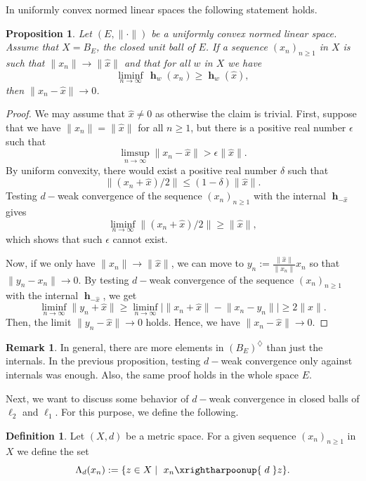 \documentclass[a4paper,12pt]{article}
\newtheorem{prop}[thm]{Proposition}
\theoremstyle{definition}
\newtheorem{rem}[thm]{Remark}
\newtheorem{defn}[thm]{Definition}
\DeclareMathOperator{\h}{\mathbf{h}}
\newcommand{\norm}[1]{\lVert#1\rVert}
\numberwithin{equation}{section}
\begin{document}
In uniformly convex normed linear spaces the following statement holds.

\begin{prop}
Let $(E,\norm{\cdot})$ be a uniformly convex normed linear space. Assume that 
$X=B_E$, the closed unit ball of $E$. If a sequence $(x_n)_{n\geq 1}$ in $X$ is 
such that $ \norm{x_n}  \rightarrow \norm{\hat x} $ and that for all $w$ in
$X$ we have 
$$
	\liminf_{n\to\infty}\,\h_w(x_n)  \geq \h_w(\hat x),
$$
then $ \norm{ x_n - \hat x }  \rightarrow 0$.
\end{prop}

\begin{proof} 
We may assume that $\hat x \not=0$ as otherwise the claim is trivial. First,
suppose that we have $\norm{x_n} = \norm{ \hat x }$ for all $n\geq 1$, but there 
is a positive real number $\epsilon$ such that
$$
	\limsup_{n\to\infty} \norm{x_n - \hat x }  > \epsilon\norm{\hat x}.
$$ 
By uniform convexity, there would exist a positive real number $\delta$ 
such that 
$$
\norm{ (x_n + \hat x)/2 }  \leq (1-\delta) \norm{\hat x }.
$$
Testing $d-$weak convergence of the sequence $(x_n)_{n\geq 1}$ with the 
internal $\h_{-\hat x}$ gives
$$
\liminf_{n\to\infty} \norm{ ( x_n + \hat x)/2 } \geq \norm{\hat x},
$$ 
which shows that such $\epsilon $ cannot exist. 

Now, if we only have  $ \norm{ x_n } \rightarrow \norm{\hat x }$, we can 
move to $y_n :=  \frac { \norm{ \hat x }}{\norm{x_n} } x_n$ so that 
$\norm{y_n -  x_n} \rightarrow 0$. By testing $d-$weak convergence of the 
sequence $(x_n)_{n\geq 1}$ with the internal $\h_{-\hat x}$, we get 
$$
	\liminf_{n\to\infty}\norm{ y_n + \hat x} 
	\geq \liminf_{n\to\infty}\Big|\norm{x_n + \hat x} - \norm{x_n - y_n} \Big| 
	\geq 2\norm{\hat x}.
$$ 
Then, the limit $\norm{y_n -  \hat x} \rightarrow 0$ holds. Hence, 
we have $\norm{x_n -  \hat x} \rightarrow 0$.
\end{proof} 

\begin{rem}
In general, there are more elements in $(B_E)^{\diamondsuit}$ than just the 
internals. In the previous proposition, testing $d-$weak convergence only 
against internals was enough. Also, the same proof holds in the whole space $E$.
\end{rem}

Next, we want to discuss some behavior of $d-$weak convergence in closed balls
of $\ell_2$ and $\ell_1$. For this purpose, we define the following.

\begin{defn}  
Let $(X,d)$ be a metric space. For a given sequence $(x_n)_{n\geq 1}$ in $X$ we 
define the set
$$
	\Lambda_d(x_n) := \{ z\in X \mid \ x_n \xrightharpoonup{\;d\;} z\}.
$$
\end{defn}
\end{document}
